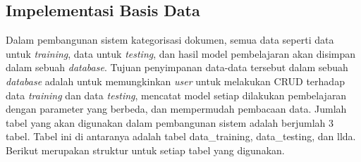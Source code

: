 \subsection{Impelementasi Basis Data}
\indent
Dalam pembangunan sistem kategorisasi dokumen, semua data seperti data untuk {\itshape training}, data untuk {\itshape testing}, dan hasil model pembelajaran akan disimpan dalam sebuah {\itshape database}. Tujuan penyimpanan data-data tersebut dalam sebuah {\itshape database} adalah untuk memungkinkan {\itshape user} untuk melakukan CRUD terhadap data {\itshape training} dan data {\itshape testing}, mencatat model setiap dilakukan pembelajaran dengan parameter yang berbeda, dan mempermudah pembacaan data. Jumlah tabel yang akan digunakan dalam pembangunan sistem adalah berjumlah 3 tabel. Tabel ini di antaranya adalah tabel data\_training, data\_testing, dan llda. Berikut merupakan struktur untuk setiap tabel yang digunakan.\\

